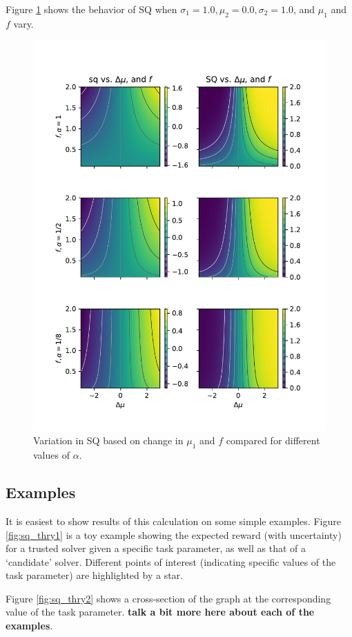 Figure \ref{fig:sq_surf} shows the behavior of SQ when $\sigma_1=1.0,\mu_2=0.0,\sigma_2=1.0$, and $\mu_1$ and $f$ vary.

\begin{figure}[tbp]
    \centering
    \includegraphics[width=0.9\linewidth]{Figures/sq_surf}
    \caption{Variation in SQ based on change in $\mu_1$ and $f$ compared for different values of $\alpha$.}
    \label{fig:sq_surf}
\end{figure}

\subsection{Examples}
It is easiest to show results of this calculation on some simple examples. Figure \ref{fig:sq_thry1} is a toy example showing the expected reward (with uncertainty) for a trusted solver given a specific task parameter, as well as that of a `candidate' solver. Different points of interest (indicating specific values of the task parameter) are highlighted by a star.

Figure \ref{fig:sq_thry2} shows a cross-section of the graph at the corresponding value of the task parameter. \textbf{talk a bit more here about each of the examples}.

